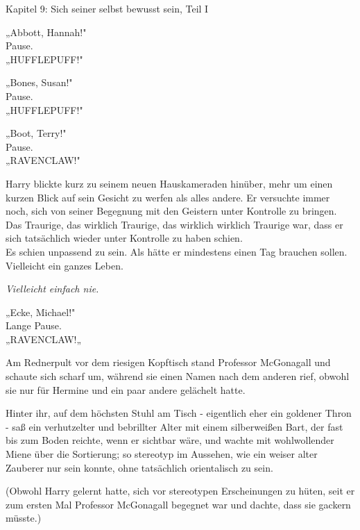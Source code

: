 

\hypertarget{sich-seiner-selbst-bewusst-sein-teil-1}{%

Kapitel 9: Sich seiner selbst bewusst sein, Teil I

„Abbott, Hannah!"\\ Pause.\\ „HUFFLEPUFF!"

„Bones, Susan!"\\ Pause.\\ „HUFFLEPUFF!"

„Boot, Terry!"\\ Pause.\\ „RAVENCLAW!"

Harry blickte kurz zu seinem neuen Hauskameraden hinüber, mehr um einen kurzen Blick auf sein Gesicht zu werfen als alles andere. Er versuchte immer noch, sich von seiner Begegnung mit den Geistern unter Kontrolle zu bringen.\\ Das Traurige, das wirklich Traurige, das wirklich wirklich Traurige war, dass er sich tatsächlich wieder unter Kontrolle zu haben schien.\\ Es schien unpassend zu sein. Als hätte er mindestens einen Tag brauchen sollen. Vielleicht ein ganzes Leben.

\emph{Vielleicht einfach nie.}

„Ecke, Michael!"\\ Lange Pause.\\ „RAVENCLAW!„

Am Rednerpult vor dem riesigen Kopftisch stand Professor McGonagall und schaute sich scharf um, während sie einen Namen nach dem anderen rief, obwohl sie nur für Hermine und ein paar andere gelächelt hatte.

Hinter ihr, auf dem höchsten Stuhl am Tisch - eigentlich eher ein goldener Thron - saß ein verhutzelter und bebrillter Alter mit einem silberweißen Bart, der fast bis zum Boden reichte, wenn er sichtbar wäre, und wachte mit wohlwollender Miene über die Sortierung; so stereotyp im Aussehen, wie ein weiser alter Zauberer nur sein konnte, ohne tatsächlich orientalisch zu sein.

(Obwohl Harry gelernt hatte, sich vor stereotypen Erscheinungen zu hüten, seit er zum ersten Mal Professor McGonagall begegnet war und dachte, dass sie gackern müsste.)

}
